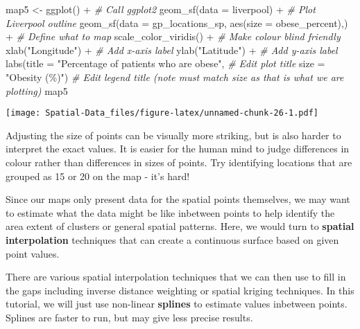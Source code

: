 \documentclass[
]{book}
\newenvironment{Shaded}{\begin{snugshade}}{\end{snugshade}}
\newcommand{\AttributeTok}[1]{\textcolor[rgb]{0.77,0.63,0.00}{#1}}
\newcommand{\CommentTok}[1]{\textcolor[rgb]{0.56,0.35,0.01}{\textit{#1}}}
\newcommand{\FunctionTok}[1]{\textcolor[rgb]{0.00,0.00,0.00}{#1}}
\newcommand{\NormalTok}[1]{#1}
\newcommand{\OtherTok}[1]{\textcolor[rgb]{0.56,0.35,0.01}{#1}}
\newcommand{\SpecialCharTok}[1]{\textcolor[rgb]{0.00,0.00,0.00}{#1}}
\newcommand{\StringTok}[1]{\textcolor[rgb]{0.31,0.60,0.02}{#1}}
\begin{document}
\begin{Shaded}
\begin{Highlighting}[]
\NormalTok{map5 }\OtherTok{\textless{}{-}} \FunctionTok{ggplot}\NormalTok{() }\SpecialCharTok{+} \CommentTok{\# Call ggplot2}
  \FunctionTok{geom\_sf}\NormalTok{(}\AttributeTok{data =}\NormalTok{ liverpool) }\SpecialCharTok{+} \CommentTok{\# Plot Liverpool outline}
  \FunctionTok{geom\_sf}\NormalTok{(}\AttributeTok{data =}\NormalTok{ gp\_locations\_sp, }\FunctionTok{aes}\NormalTok{(}\AttributeTok{size =}\NormalTok{ obese\_percent),) }\SpecialCharTok{+} \CommentTok{\# Define what to map}
  \FunctionTok{scale\_color\_viridis}\NormalTok{() }\SpecialCharTok{+} \CommentTok{\# Make colour blind friendly}
  \FunctionTok{xlab}\NormalTok{(}\StringTok{"Longitude"}\NormalTok{) }\SpecialCharTok{+} \CommentTok{\# Add x{-}axis label}
  \FunctionTok{ylab}\NormalTok{(}\StringTok{"Latitude"}\NormalTok{) }\SpecialCharTok{+} \CommentTok{\# Add y{-}axis label}
  \FunctionTok{labs}\NormalTok{(}\AttributeTok{title =} \StringTok{"Percentage of patients who are obese"}\NormalTok{, }\CommentTok{\# Edit plot title }
       \AttributeTok{size =} \StringTok{"Obesity (\%)"}\NormalTok{) }\CommentTok{\# Edit legend title (note must match size as that is what we are plotting)}
\NormalTok{map5}
\end{Highlighting}
\end{Shaded}

\texttt{[image: Spatial-Data\_files/figure-latex/unnamed-chunk-26-1.pdf]}

Adjusting the size of points can be visually more striking, but is also harder to interpret the exact values. It is easier for the human mind to judge differences in colour rather than differences in sizes of points. Try identifying locations that are grouped as 15 or 20 on the map - it's hard!

Since our maps only present data for the spatial points themselves, we may want to estimate what the data might be like inbetween points to help identify the area extent of clusters or general spatial patterns. Here, we would turn to \textbf{spatial interpolation} techniques that can create a continuous surface based on given point values.

There are various spatial interpolation techniques that we can then use to fill in the gaps including inverse distance weighting or spatial kriging techniques. In this tutorial, we will just use non-linear \textbf{splines} to estimate values inbetween points. Splines are faster to run, but may give less precise results.
\end{document}
